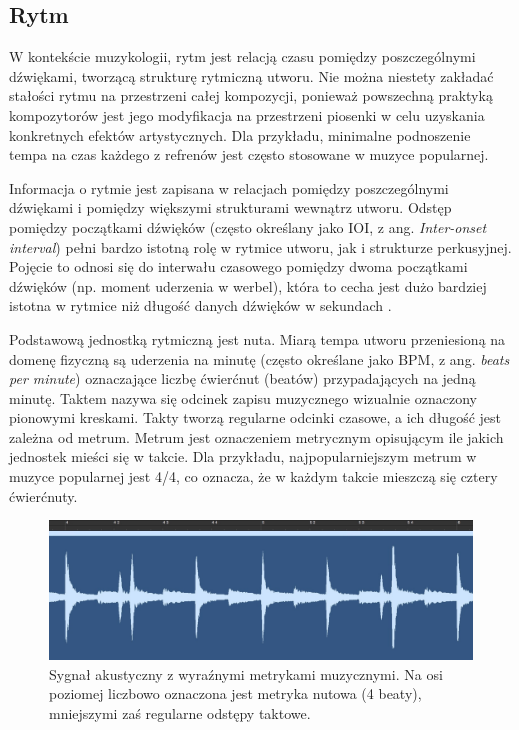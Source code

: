 \documentclass[12pt,a4paper,twoside]{mwart}
\begin{document}
\subsection{Rytm} \label{sec:rytm}
W kontekście muzykologii, rytm jest relacją czasu pomiędzy poszczególnymi dźwiękami, tworzącą strukturę rytmiczną utworu. Nie można niestety zakładać stałości rytmu na przestrzeni całej kompozycji, ponieważ powszechną praktyką kompozytorów jest jego modyfikacja na przestrzeni piosenki w celu uzyskania konkretnych efektów artystycznych. Dla przykładu, minimalne podnoszenie tempa na czas każdego z refrenów jest często stosowane w muzyce popularnej.

Informacja o rytmie jest zapisana w relacjach pomiędzy poszczególnymi dźwiękami i pomiędzy większymi strukturami wewnątrz utworu. Odstęp pomiędzy początkami dźwięków (często określany jako IOI, z ang. \textit{Inter-onset interval}) pełni bardzo istotną rolę w rytmice utworu, jak i strukturze perkusyjnej. Pojęcie to odnosi się do interwału czasowego pomiędzy dwoma początkami dźwięków (np. moment uderzenia w werbel), która to cecha jest dużo bardziej istotna w rytmice niż długość danych dźwięków w sekundach
\cite[482-489]{Transcription:Clarke:RhythmAndTiming}.

Podstawową jednostką rytmiczną jest nuta. Miarą tempa utworu przeniesioną na domenę fizyczną są uderzenia na minutę (często określane jako BPM, z ang. \textit{beats per minute}) oznaczające liczbę ćwierćnut (beatów) przypadających na jedną minutę. Taktem nazywa się odcinek zapisu muzycznego wizualnie oznaczony pionowymi kreskami. Takty tworzą regularne odcinki czasowe, a ich długość jest zależna od metrum. Metrum jest oznaczeniem metrycznym opisującym ile jakich jednostek mieści się w takcie. Dla przykładu, najpopularniejszym metrum w muzyce popularnej jest 4/4, co oznacza, że w każdym takcie mieszczą się cztery ćwierćnuty.

\begin{figure}[h]
  \begin{center}
    \includegraphics[scale=0.3]{images/RythmMertic.jpg}
    \caption{Sygnał akustyczny z wyraźnymi metrykami muzycznymi. Na osi poziomej liczbowo oznaczona jest metryka nutowa (4 beaty), mniejszymi zaś regularne odstępy taktowe.}
    \label{fig:rythmMertic}
  \end{center}
\end{figure}
\end{document}
